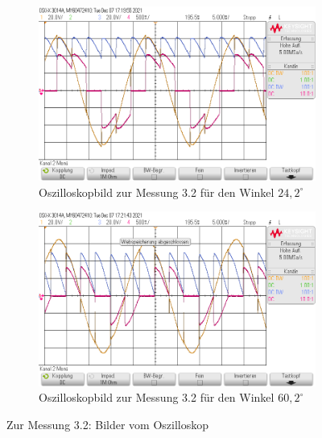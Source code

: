 \documentclass{article}
\begin{document}
\begin{figure}[h]
  \centering
  \begin{subfigure}{.45\textwidth}
    \centering
    \includegraphics[width=\linewidth]{../assets/images/GEP2/32_Winkel242.png}
    \caption{Oszilloskopbild zur Messung 3.2 für den Winkel $24,2^{\circ}$}
  \end{subfigure}
  \begin{subfigure}{.45\textwidth}
    \centering
    \includegraphics[width=\linewidth]{../assets/images/GEP2/32_Winkel602.png}
    \caption{Oszilloskopbild zur Messung 3.2 für den Winkel $60,2^{\circ}$}
  \end{subfigure}
  \label{fig:31_242}
  \caption{Zur Messung 3.2: Bilder vom Oszilloskop}
\end{figure}
\end{document}
